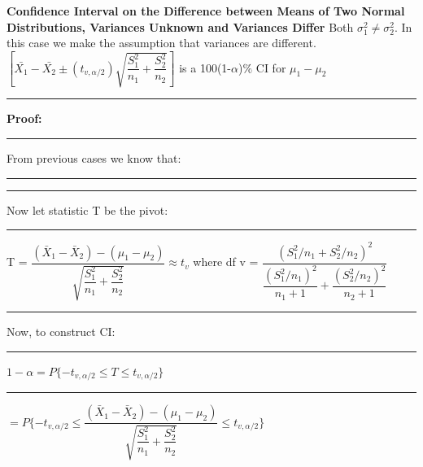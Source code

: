 \documentclass[]{article}
\begin{document}
\newline
\Large\textbf{Confidence Interval on the Difference between Means of Two Normal Distributions, Variances Unknown and Variances Differ}
\newline Both  $\sigma^2_1 \ne \sigma^2_2$. In this case we make the assumption that variances are different.
\newline
\newline
$\left[ \bar{X_{1}} - \bar{X_{2}} \pm \left( t_{v, \alpha / 2 }  \right) \sqrt{\dfrac{S^2_1}{n_1} + \dfrac{S^2_2}{n_2}    }      \right] $ is a 100(1-$\alpha$)$\%$ CI for $\mu_1 - \mu_2$ 
\newline 
\newline
\newline\Large\rule{3.0cm}{0pt} \textbf{Proof:}
\newline\Large\rule{3.0cm}{0pt} From previous cases we know that:
\newline\Large\rule{3.0cm}{0pt}     
\newline\newline\Large\rule{3.0cm}{0pt} Now let statistic T be the  pivot:
\newline\newline\Large\rule{3.0cm}{0pt} T = $\dfrac{  (  \bar{X}_1 - \bar{X}_2 )  -  (\mu_1 - \mu_2)   }{\sqrt{\dfrac{S^2_1}{n_1} + \dfrac{S^2_2}{n_2}}} \approx t_{v}$ 
where df
v = $\dfrac{  (  S^2_1 / n_1  + S^2_2 / n_2  )^2  }{  \dfrac{(S^2_1 / n_1)^2}{n_1 +1}   +  \dfrac{(S^2_2 / n_2)^2}{n_2 +1}    }$
\newline
\newline 
\newline\Large\rule{3.0cm}{0pt} Now, to construct CI:
\newline
\newline\Large\rule{3.0cm}{0pt} $1 - \alpha = P \{ -t_{v, \alpha / 2} \le T \le t_{v, \alpha / 2} \}$ 
\newline
\newline
\newline\Large\rule{4.3cm}{0pt} $ = P \{ -t_{v, \alpha / 2} \le \dfrac{  (  \bar{X}_1 - \bar{X}_2 )  -  (\mu_1 - \mu_2)   }{\sqrt{\dfrac{S^2_1}{n_1} + \dfrac{S^2_2}{n_2}}}  \le t_{v, \alpha /2} \}$
\newline
\newline
\newline
\end{document}
